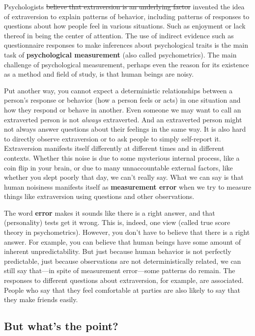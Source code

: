 \documentclass[openany]{book}
\begin{document}
Psychologists \sout{believe that extraversion is an underlying factor} invented the idea of extraversion to explain patterns of behavior, including patterns of responses to questions about how people feel in various situations. Such as enjoyment or lack thereof in being the center of attention. The use of indirect evidence such as questionnaire responses to make inferences about psychological traits is the main task of \textbf{psychological measurement} (also called psychometrics). The main challenge of psychological measurement, perhaps even the reason for its existence as a method and field of study, is that human beings are noisy.

Put another way, you cannot expect a deterministic relationships between a person's response or behavior (how a person feels or acts) in one situation and how they respond or behave in another. Even someone we may want to call an extraverted person is not \emph{always} extraverted. And an extraverted person might not always answer questions about their feelings in the same way. It is also hard to directly observe extraversion or to ask people to simply self-report it. Extraversion manifests itself differently at different times and in different contexts. Whether this noise is due to some mysterious internal process, like a coin flip in your brain, or due to many unnaccountable external factors, like whether you slept poorly that day, we can't really say. What we can say is that human noisiness manifests itself as \textbf{measurement error} when we try to measure things like extraversion using questions and other observations.

The word \textbf{error} makes it sounds like there is a right answer, and that (personality) tests get it wrong. This is, indeed, one view (called true score theory in psychometrics). However, you don't have to believe that there is a right answer. For example, you can believe that human beings have some amount of inherent unpredictability. But just because human behavior is not perfectly predictable, just because observations are not deterministically related, we can still say that---in spite of measurement error---some patterns do remain. The responses to different questions about extraversion, for example, are associated. People who say that they feel comfortable at parties are also likely to say that they make friends easily.

\hypertarget{but-whats-the-point}{%
\subsection*{But what's the point?}\label{but-whats-the-point}}
\end{document}
